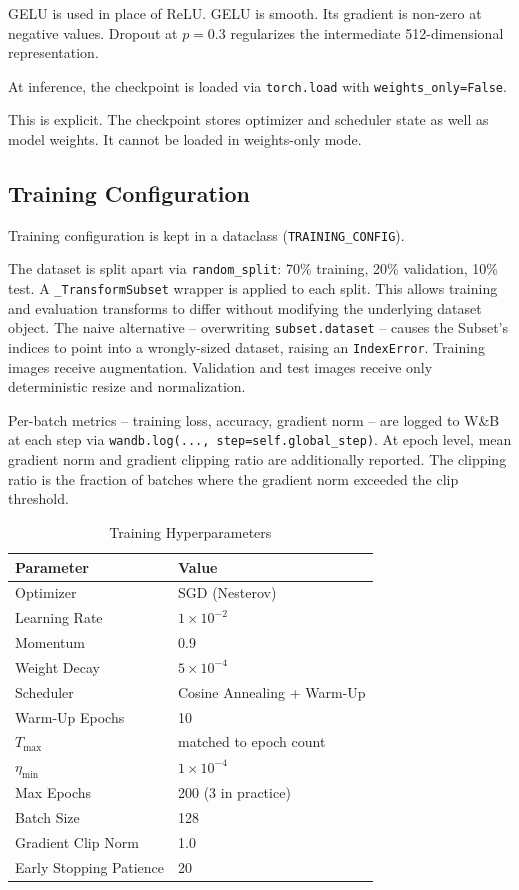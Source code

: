 GELU is used in place of ReLU. GELU is smooth. Its gradient is non-zero at negative values. Dropout at $p = 0.3$ regularizes the intermediate 512-dimensional representation.

At inference, the checkpoint is loaded via \texttt{torch.load} with \texttt{weights\_only=False}. 

This is explicit. The checkpoint stores optimizer and scheduler state as well as model weights. 
It cannot be loaded in weights-only mode. 

\subsection{Training Configuration}

Training configuration is kept in a dataclass (\texttt{TRAINING\_CONFIG}). 

The dataset is split apart via \texttt{random\_split}: 70\% training, 20\% validation, 10\% test. 
A \texttt{\_TransformSubset} wrapper is applied to each split. 
This allows training and evaluation transforms to differ without modifying the underlying dataset object. 
The naive alternative -- overwriting \texttt{subset.dataset} -- causes the Subset's indices to point into a wrongly-sized dataset, raising an \texttt{IndexError}. Training images receive augmentation. Validation and test images receive only deterministic resize and normalization.

Per-batch metrics -- training loss, accuracy, gradient norm -- are logged to W\&B at each step via \texttt{wandb.log(..., step=self.global\_step)}. At epoch level, mean gradient norm and gradient clipping ratio are additionally reported. The clipping ratio is the fraction of batches where the gradient norm exceeded the clip threshold.

\begin{table}[h]
\caption{Training Hyperparameters}
\label{tab:config}
\centering
\begin{tabular}{ll}
\toprule
\textbf{Parameter} & \textbf{Value} \\
\midrule
Optimizer & SGD (Nesterov) \\
Learning Rate & $1 \times 10^{-2}$ \\
Momentum & 0.9 \\
Weight Decay & $5 \times 10^{-4}$ \\
Scheduler & Cosine Annealing + Warm-Up \\
Warm-Up Epochs & 10 \\
$T_{\max}$ & matched to epoch count \\
$\eta_{\min}$ & $1 \times 10^{-4}$ \\
Max Epochs & 200 (3 in practice) \\
Batch Size & 128 \\
Gradient Clip Norm & 1.0 \\
Early Stopping Patience & 20 \\
\bottomrule
\end{tabular}
\end{table}

